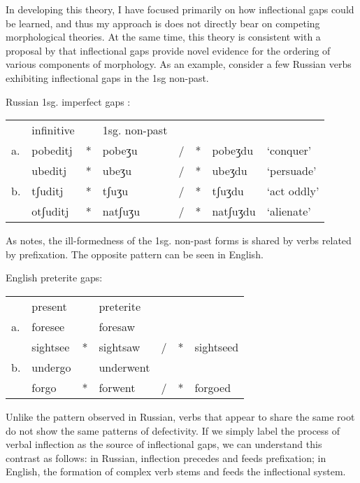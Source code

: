 In developing this theory, I have focused primarily on how inflectional gaps could be learned, and thus my approach is does not directly bear on competing morphological theories. At the same time, this theory is consistent with a proposal by \citet{Pesetsky1977} that inflectional gaps provide novel evidence for the ordering of various components of morphology. As an example, consider a few Russian verbs exhibiting inflectional gaps in the 1sg non-past. 

\ex Russian 1sg. imperfect gaps \citep[after][]{Pesetsky1977}: \\
\begin{tabular}{l l l@{}l@{}l@{}l@{}l@{} l}
   & infinitive &   & 1sg. non-past \\
a. & pobedit{j} & * & pobeʒu  & / & * & pobeʒdu  & `conquer'   \\
   & ubedit{j}  & * & ubeʒu   & / & * & ubeʒdu   & `persuade'  \\
b. & tʃudit{j}  & * & tʃuʒu   & / & * & tʃuʒdu & `act oddly'   \\
   & otʃudit{j} & * & natʃuʒu & / & * & natʃuʒdu & `alienate'  \\
\end{tabular}

\noindent
As \citealt{Pesetsky1977} notes, the ill-formedness of the 1sg. non-past forms is shared by verbs related by prefixation. The opposite pattern can be seen in English. 

\ex English preterite gaps: \\
\begin{tabular}{l l l@{}l@{}l@{}l@{}l@{}}
   & present  &   & preterite &   &   &           \\
a. & foresee  &   & foresaw   &   &   &           \\
   & sightsee & * & sightsaw  & / & * & sightseed \\
b. & undergo  &   & underwent &   &   &           \\
   & forgo    & * & forwent   & / & * & forgoed   \\
\end{tabular}

Unlike the pattern observed in Russian, verbs that appear to share the same root do not show the same patterns of defectivity. If we simply label the process of verbal inflection as the source of inflectional gaps, we can understand this contrast as follows: in Russian, inflection precedes and feeds prefixation; in English, the formation of complex verb stems and feeds the inflectional system. 

